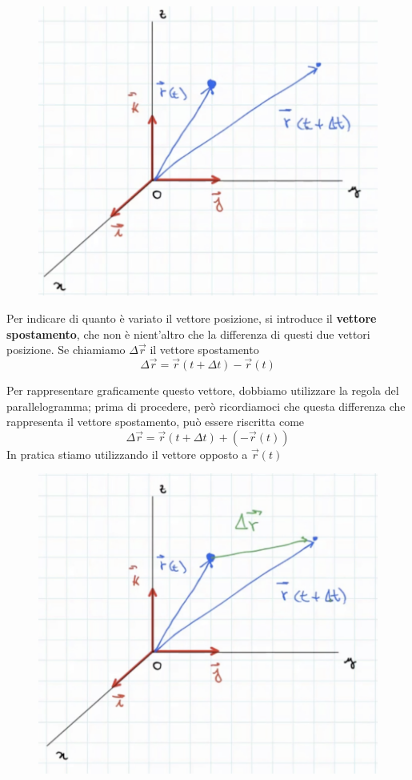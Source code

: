 \documentclass[a4paper]{book}
\begin{document}
\begin{figure}[h]
\begin{center}
\includegraphics[width = 0.5 \textwidth]{sistema riferimento4}
\label{fig:riferimento4}
\end{center}
\end{figure}

Per indicare di quanto è variato il vettore posizione, si introduce il \textbf{vettore spostamento}, che non è nient'altro che la differenza di questi due vettori posizione. Se chiamiamo $ \Delta \overrightarrow{r} $ il vettore spostamento
$$ \Delta \overrightarrow{r} = \overrightarrow{r} ( t + \Delta t) - \overrightarrow{r} ( t ) $$

Per rappresentare graficamente questo vettore, dobbiamo utilizzare la regola del parallelogramma; prima di procedere, però ricordiamoci che questa differenza che rappresenta il vettore spostamento, può essere riscritta come
$$ \Delta \overrightarrow{r} = \overrightarrow{r} ( t + \Delta t) + ( - \overrightarrow{r} ( t ) ) $$
\newpage
In pratica stiamo utilizzando il vettore opposto a $ \overrightarrow{r} (t) $

\begin{figure}[h]
\begin{center}
\includegraphics[width = 0.5 \textwidth]{sistema riferimento5}
\label{fig:riferimento5}
\end{center}
\end{figure}
\end{document}

